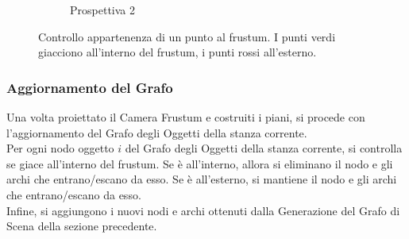 \begin{figure}[h]
\begin{subfigure}[b]{0.5\textwidth}
    \caption{
      Prospettiva 2
    }
  \end{subfigure}
  \caption{
    Controllo appartenenza di un punto al frustum. I punti verdi giacciono all'interno del frustum, i punti rossi all'esterno.
  }
\end{figure}

\subsubsection{Aggiornamento del Grafo}
Una volta proiettato il Camera Frustum e costruiti i piani, si procede con l'aggiornamento del Grafo degli Oggetti della stanza corrente.\\
Per ogni nodo oggetto $i$ del Grafo degli Oggetti della stanza corrente, si controlla se giace all'interno del frustum. Se è all'interno, allora si eliminano il nodo e gli archi che entrano/escano da esso. Se è all'esterno, si mantiene il nodo e gli archi che entrano/escano da esso.\\
Infine, si aggiungono i nuovi nodi e archi ottenuti dalla Generazione del Grafo di Scena della sezione precedente.

